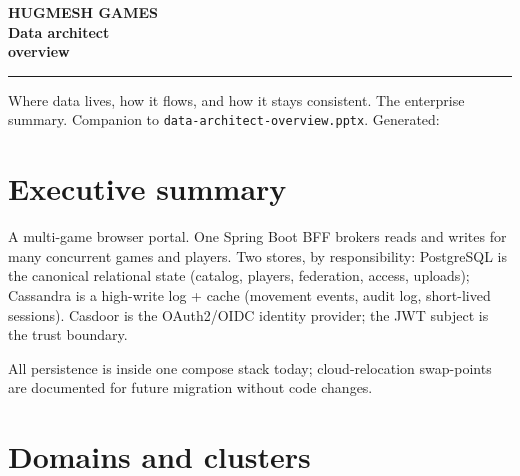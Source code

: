 \documentclass[11pt,a4paper,openany]{book}
\begin{document}
\begin{titlepage}\thispagestyle{empty}
\noindent{}
\vspace*{4cm}\noindent
{\sffamily\bfseries
  {\color{snapAccentTwo}\fontsize{18}{22}\selectfont HUGMESH GAMES}\\[3mm]
  {\color{white}\fontsize{42}{50}\selectfont Data architect\\overview}\par}
\vspace{1.5cm}\noindent\color{white!75!snapAccentTwo}\rule{0.4\linewidth}{1.2pt}
\vspace{0.8cm}\noindent
{\sffamily\color{white!85}\large
Where data lives, how it flows, and how it stays consistent. The
enterprise summary.}
\vfill\noindent
{\sffamily\color{white!70}\small
Companion to \texttt{data-architect-overview.pptx}. Generated: \snapbuilddate{} \snapbuildtime}
\end{titlepage}

\frontmatter\pagestyle{empty}\tableofcontents\clearpage
\mainmatter\pagestyle{fancy}

\chapter{Executive summary}
A multi-game browser portal. One Spring Boot BFF brokers reads and
writes for many concurrent games and players. Two stores, by
responsibility: PostgreSQL is the canonical relational state (catalog,
players, federation, access, uploads); Cassandra is a high-write log +
cache (movement events, audit log, short-lived sessions). Casdoor is
the OAuth2/OIDC identity provider; the JWT subject is the trust
boundary.

All persistence is inside one compose stack today; cloud-relocation
swap-points are documented for future migration without code changes.

\chapter{Domains and clusters}
\end{document}
